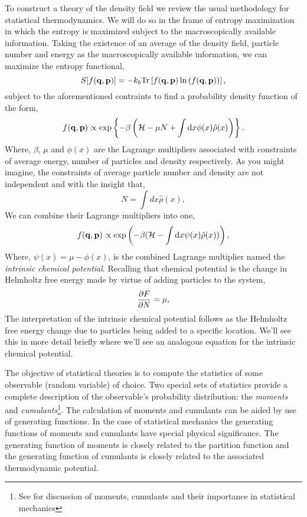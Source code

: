 To construct a theory of the density field we review the usual methodology for
statistical thermodynamics. We will do so in the frame of entropy maximization
in which the entropy is maximized subject to the macroscopically available
information. Taking the existence of an average of the density field, particle
number and energy as the macroscopically available information, we can maximize
the entropy functional,
%
\begin{equation}
    S[f(\mathbf{q}, \mathbf{p})] = -k_b \mathrm{Tr}\left[ f(\mathbf{q}, \mathbf{p})\ln\left(f(\mathbf{q}, \mathbf{p})\right) \right], 
\end{equation}
%
subject to the aforementioned contraints to find a probability density function
of the form,
%
\begin{equation} 
    f(\mathbf{q}, \mathbf{p}) \propto \exp\left\lbrace-\beta \left(\mathcal{H} -\mu N + \int \mathrm{d}x
        \phi(x)\hat{\rho}(x)\right)\right\rbrace.
\end{equation}
%
Where, $\beta$, $\mu$ and $\phi(x)$ are the Lagrange multipliers associated
with constraints of average energy, number of particles and density
respectively. As you might imagine, the constraints of average particle number
and density are not independent and with the insight that,
%
\begin{equation}
    N = \int dx \hat{\rho}(x),
\end{equation}
%
We can combine their Lagrange multipliers into one,
%
\begin{equation}
    f(\mathbf{q}, \mathbf{p}) \propto \exp\left(- \beta(\mathcal{H} - \int \mathrm{d}x \psi(x)
        \hat{\rho}(x))\right),
\end{equation}
%
Where, $\psi(x) = \mu - \phi(x)$, is the combined Lagrange multiplier named
the \textit{intrinsic chemical potential}. Recalling that chemical potential is
the change in Helmholtz free energy made by virtue of adding particles to the
system,
%
\begin{equation}
    \label{eq:chem_potential} 
    \frac{\partial F}{\partial N} = \mu,
\end{equation}
%
The interpretation of the intrinsic chemical potential follows as the Helmholtz
free energy change due to particles being added to a specific location.  We'll
see this in more detail briefly where we'll see an analogous equation for the
intrinsic chemical potential.

The objective of statistical theories is to compute the statistics of some
observable (random variable) of choice. Two special sets of statistics provide
a complete description of the observable's probability distribution: the
\textit{moments} and \textit{cumulants}\footnote{See \cite{KUBO62} for
discussion of moments, cumulants and their importance in statistical
mechanics}.  The calculation of moments and cumulants can be aided by use of
generating functions. In the case of statistical mechanics the generating
functions of moments and cumulants have special physical significance. The
generating function of moments is closely related to the partition function and
the generating function of cumulants is closely related to the associated
thermodynamic potential. 

